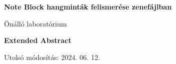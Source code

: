 
\begin{titlepage}
    \begin{center}
        \vspace*{1cm}
            
        \Huge
        \textbf{Note Block hangminták felismerése zenefájlban}
            
        \vspace{0.5cm}
        \LARGE
        Önálló laboratórium
            
        \vspace{2.5cm}
            
        \textbf{Extended Abstract}\\
            
        \vfill
            
            
        \vspace{0.8cm}
            
            
        \Large
        Utolsó módosítás: 2024. 06. 12.
        \vspace*{1cm}
            
    \end{center}
\end{titlepage}
